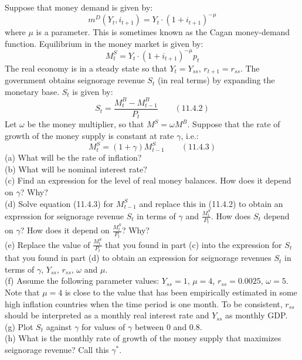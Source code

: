 \documentclass[12pt, letterpaper]{article}
\newcommand{\mD}{m^{D}}
\newcommand{\Ms}{M^{S}}
\newcommand{\MBase}{M^{B}}
\begin{document}
\begin{tcolorbox}[evenbox,title={Problem 11.6 \quad Seignorage with High Inflation}]
\begin{tcolorbox}[questionbox]
Suppose that money demand is given by:
\[
\mD(Y_t,i_{t+1})=Y_t\cdot(1+i_{t+1})^{-\mu}
\]
where $\mu$ is a parameter. This is sometimes known as the Cagan money-demand function.
Equilibrium in the money market is given by:
\[
\Ms_t=Y_t\cdot(1+i_{t+1})^{-\mu}p_t
\]
The real economy is in a steady state so that $Y_t=Y_{ss}$, $r_{t+1}=r_{ss}$. The government
obtains seignorage revenue $S_t$ (in real terms) by expanding the monetary base. $S_t$ is given by:
\[
S_t=\frac{\MBase_t-\MBase_{t-1}}{P_t}\qquad(11.4.2)
\]
Let $\omega$ be the money multiplier, so that $\Ms=\omega\MBase$. Suppose that the rate of growth
of the money supply is constant at rate $\gamma$, i.e.:
\[
\Ms_t=(1+\gamma)\Ms_{t-1}\qquad(11.4.3)
\]
(a) What will be the rate of inflation?\\
(b) What will be nominal interest rate?\\
(c) Find an expression for the level of real money balances. How does it depend on $\gamma$? Why?\\
(d) Solve equation (11.4.3) for $\Ms_{t-1}$ and replace this in (11.4.2) to obtain an expression
for seignorage revenue $S_t$ in terms of $\gamma$ and $\frac{\Ms_t}{P_t}$. How does $S_t$ depend on
$\gamma$? How does it depend on $\frac{\Ms_t}{P_t}$? Why?\\
(e) Replace the value of $\frac{\Ms_t}{P_t}$ that you found in part (c) into the expression for
$S_t$ that you found in part (d) to obtain an expression for seignorage revenues $S_t$ in terms of
$\gamma$, $Y_{ss}$, $r_{ss}$, $\omega$ and $\mu$.\\
(f) Assume the following parameter values: $Y_{ss}=1$, $\mu=4$, $r_{ss}=0.0025$, $\omega=5$.
Note that $\mu=4$ is close to the value that has been empirically estimated in some high inflation
countries when the time period is one month. To be consistent, $r_{ss}$ should be interpreted as a
monthly real interest rate and $Y_{ss}$ as monthly GDP.\\
(g) Plot $S_t$ against $\gamma$ for values of $\gamma$ between 0 and 0.8.\\
(h) What is the monthly rate of growth of the money supply that maximizes seignorage revenue?
Call this $\gamma^\ast$.
\end{tcolorbox}

\end{tcolorbox}
\end{document}
